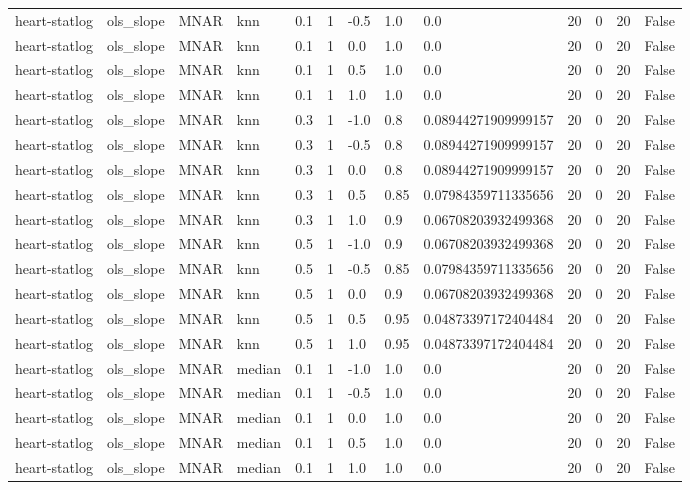 \begin{tabular}{lllllllllllll}
heart-statlog & ols\_slope & MNAR & knn & 0.1 & 1 & -0.5 & 1.0 & 0.0 & 20 & 0 & 20 & False \\
heart-statlog & ols\_slope & MNAR & knn & 0.1 & 1 & 0.0 & 1.0 & 0.0 & 20 & 0 & 20 & False \\
heart-statlog & ols\_slope & MNAR & knn & 0.1 & 1 & 0.5 & 1.0 & 0.0 & 20 & 0 & 20 & False \\
heart-statlog & ols\_slope & MNAR & knn & 0.1 & 1 & 1.0 & 1.0 & 0.0 & 20 & 0 & 20 & False \\
heart-statlog & ols\_slope & MNAR & knn & 0.3 & 1 & -1.0 & 0.8 & 0.08944271909999157 & 20 & 0 & 20 & False \\
heart-statlog & ols\_slope & MNAR & knn & 0.3 & 1 & -0.5 & 0.8 & 0.08944271909999157 & 20 & 0 & 20 & False \\
heart-statlog & ols\_slope & MNAR & knn & 0.3 & 1 & 0.0 & 0.8 & 0.08944271909999157 & 20 & 0 & 20 & False \\
heart-statlog & ols\_slope & MNAR & knn & 0.3 & 1 & 0.5 & 0.85 & 0.07984359711335656 & 20 & 0 & 20 & False \\
heart-statlog & ols\_slope & MNAR & knn & 0.3 & 1 & 1.0 & 0.9 & 0.06708203932499368 & 20 & 0 & 20 & False \\
heart-statlog & ols\_slope & MNAR & knn & 0.5 & 1 & -1.0 & 0.9 & 0.06708203932499368 & 20 & 0 & 20 & False \\
heart-statlog & ols\_slope & MNAR & knn & 0.5 & 1 & -0.5 & 0.85 & 0.07984359711335656 & 20 & 0 & 20 & False \\
heart-statlog & ols\_slope & MNAR & knn & 0.5 & 1 & 0.0 & 0.9 & 0.06708203932499368 & 20 & 0 & 20 & False \\
heart-statlog & ols\_slope & MNAR & knn & 0.5 & 1 & 0.5 & 0.95 & 0.04873397172404484 & 20 & 0 & 20 & False \\
heart-statlog & ols\_slope & MNAR & knn & 0.5 & 1 & 1.0 & 0.95 & 0.04873397172404484 & 20 & 0 & 20 & False \\
heart-statlog & ols\_slope & MNAR & median & 0.1 & 1 & -1.0 & 1.0 & 0.0 & 20 & 0 & 20 & False \\
heart-statlog & ols\_slope & MNAR & median & 0.1 & 1 & -0.5 & 1.0 & 0.0 & 20 & 0 & 20 & False \\
heart-statlog & ols\_slope & MNAR & median & 0.1 & 1 & 0.0 & 1.0 & 0.0 & 20 & 0 & 20 & False \\
heart-statlog & ols\_slope & MNAR & median & 0.1 & 1 & 0.5 & 1.0 & 0.0 & 20 & 0 & 20 & False \\
heart-statlog & ols\_slope & MNAR & median & 0.1 & 1 & 1.0 & 1.0 & 0.0 & 20 & 0 & 20 & False \\

\end{tabular}
